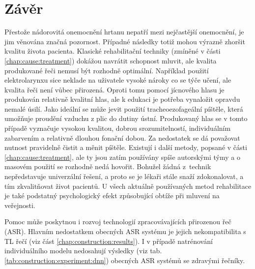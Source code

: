 \chapter{Závěr}
\label{chap:conclusion}

Přestože nádorovitá onemocnění hrtanu nepatří mezi nejčastější onemocnění, je
jim věnována značná pozornost. Případné následky totiž mohou výrazně zhoršit
kvalitu života pacienta. Klasické rehabilitační techniky (zmíněné v části
\ref{chap:cause:treatment}) dokážou navrátit schopnost mluvit, ale kvalita
produkované řeči nemusí být rozhodně optimální. Například použití
elektrolarynxu sice neklade na uživatele vysoké nároky co se týče učení, ale
kvalita řeči není vůbec přirozená. Oproti tomu pomocí jícnového hlasu je
produkován relativně kvalitní hlas, ale k edukaci je potřeba vynaložit opravdu
nemalé úsilí. Jako ideální se může jevit použití tracheoezofageální píštěle,
která umožňuje proudění vzduchu z plic do dutiny ústní. Produkovaný hlas se v
tomto případě vyznačuje vysokou kvalitou, dobrou srozumitelností,
individuálním zabarvením a relativně dlouhou fonační dobou. Za nedostatek se
dá považovat nutnost pravidelně čistit a měnit píštěle. Existují i další
metody, popsané v části \ref{chap:cause:treatment}, ale ty jsou zatím používány
spíše autorskými týmy a o masovém použití se rozhodně nedá hovořit. Bohužel
žádná z~technik nepředstavuje univerzální řešení, a proto se je lékaři
stále snaží zdokonalovat, a tím zkvalitňovat život pacientů. U všech aktuálně používaných metod rehabilitace je také podstatný psychologický efekt způsobující obtíže při mluvení na veřejnosti.

Pomoc může poskytnou i rozvoj technologií zpracovávajících přirozenou řeč (ASR). Hlavním nedostatkem obecných ASR systému je jejich nekompatibilita s TL řečí (viz část \ref{chap:construction:results}). I v případě natrénování individuálního modelu nedosahují výsledky (viz tab. \ref{tab:construction:experiment:dnn}) obecných ASR systémů se zdravými řečníky.


